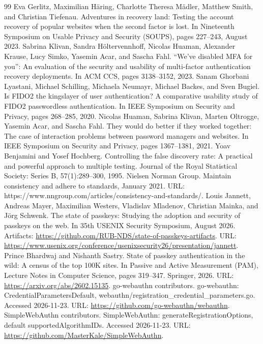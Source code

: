 \documentclass[letterpaper,twocolumn,10pt]{article}
\begin{document}
\begin{thebibliography}{99}
 Eva Gerlitz, Maximilian Häring, Charlotte Theresa Mädler, Matthew Smith, and Christian Tiefenau. Adventures in recovery land: Testing the account recovery of popular websites when the second factor is lost. In Nineteenth Symposium on Usable Privacy and Security (SOUPS), pages 227--243, August 2023.
 Sabrina Klivan, Sandra Höltervennhoff, Nicolas Huaman, Alexander Krause, Lucy Simko, Yasemin Acar, and Sascha Fahl. ``We've disabled MFA for you'': An evaluation of the security and usability of multi-factor authentication recovery deployments. In ACM CCS, pages 3138--3152, 2023.
 Sanam Ghorbani Lyastani, Michael Schilling, Michaela Neumayr, Michael Backes, and Sven Bugiel. Is FIDO2 the kingslayer of user authentication? A comparative usability study of FIDO2 passwordless authentication. In IEEE Symposium on Security and Privacy, pages 268--285, 2020.
 Nicolas Huaman, Sabrina Klivan, Marten Oltrogge, Yasemin Acar, and Sascha Fahl. They would do better if they worked together: The case of interaction problems between password managers and websites. In IEEE Symposium on Security and Privacy, pages 1367--1381, 2021.
 Yoav Benjamini and Yosef Hochberg. Controlling the false discovery rate: A practical and powerful approach to multiple testing. Journal of the Royal Statistical Society: Series B, 57(1):289--300, 1995.
 Nielsen Norman Group. Maintain consistency and adhere to standards, January 2021. URL: https://www.nngroup.com/articles/consistency-and-standards/.
 Louis Jannett, Andreas Mayer, Maximilian Westers, Vladislav Mladenov, Christian Mainka, and Jörg Schwenk. The state of passkeys: Studying the adoption and security of passkeys on the web. In 35th USENIX Security Symposium, August 2026. Artifacts: \url{https://github.com/RUB-NDS/state-of-passkeys-artifacts}. URL: \url{https://www.usenix.org/conference/usenixsecurity26/presentation/jannett}.
 Prince Bhardwaj and Nishanth Sastry. State of passkey authentication in the wild: A census of the top 100K sites. In Passive and Active Measurement (PAM), Lecture Notes in Computer Science, pages 319--347. Springer, 2026. URL: \url{https://arxiv.org/abs/2602.15135}.
 go-webauthn contributors. go-webauthn: CredentialParametersDefault, webauthn/registration\_credential\_parameters.go. Accessed 2026-11-23. URL: \url{https://github.com/go-webauthn/webauthn}.
 SimpleWebAuthn contributors. SimpleWebAuthn: generateRegistrationOptions, default supportedAlgorithmIDs. Accessed 2026-11-23. URL: \url{https://github.com/MasterKale/SimpleWebAuthn}.
\end{thebibliography}
\end{document}
